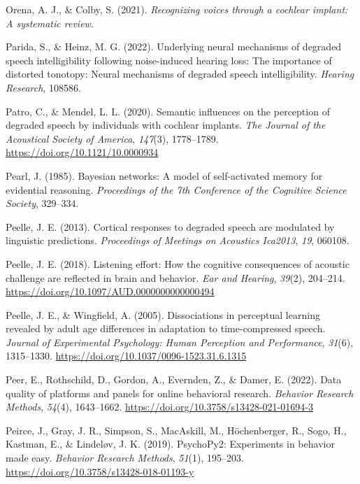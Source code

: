 \documentclass[a4paper, nobind]{templates/ociamthesis}
\newlength{\cslhangindent}
\newenvironment{CSLReferences}[2] %
 {%
  \setlength{\parindent}{0pt}
  \ifodd #1
  \let\oldpar\par
  \def\par{\hangindent=\cslhangindent\oldpar}
  \fi
  \setlength{\parskip}{1mm}
  \setlength{\baselineskip}{6mm}
 }%
 {}
\begin{document}
\begin{CSLReferences}{1}{0}
\leavevmode{}%
Orena, A. J., \& Colby, S. (2021). \emph{Recognizing voices through a cochlear implant: A systematic review}.

\leavevmode{}%
Parida, S., \& Heinz, M. G. (2022). Underlying neural mechanisms of degraded speech intelligibility following noise-induced hearing loss: The importance of distorted tonotopy: Neural mechanisms of degraded speech intelligibility. \emph{Hearing Research}, 108586.

\leavevmode{}%
Patro, C., \& Mendel, L. L. (2020). Semantic influences on the perception of degraded speech by individuals with cochlear implants. \emph{The Journal of the Acoustical Society of America}, \emph{147}(3), 1778--1789. \url{https://doi.org/10.1121/10.0000934}

\leavevmode{}%
Pearl, J. (1985). {Bayesian networks: A model of self-activated memory for evidential reasoning}. \emph{Proceedings of the 7th Conference of the Cognitive Science Society}, 329--334.

\leavevmode{}%
Peelle, J. E. (2013). Cortical responses to degraded speech are modulated by linguistic predictions. \emph{Proceedings of Meetings on Acoustics Ica2013}, \emph{19}, 060108.

\leavevmode{}%
Peelle, J. E. (2018). {Listening effort: How the cognitive consequences of acoustic challenge are reflected in brain and behavior}. \emph{Ear and Hearing}, \emph{39}(2), 204--214. \url{https://doi.org/10.1097/AUD.0000000000000494}

\leavevmode{}%
Peelle, J. E., \& Wingfield, A. (2005). {Dissociations in perceptual learning revealed by adult age differences in adaptation to time-compressed speech}. \emph{Journal of Experimental Psychology: Human Perception and Performance}, \emph{31}(6), 1315--1330. \url{https://doi.org/10.1037/0096-1523.31.6.1315}

\leavevmode{}%
Peer, E., Rothschild, D., Gordon, A., Evernden, Z., \& Damer, E. (2022). {Data quality of platforms and panels for online behavioral research}. \emph{Behavior Research Methods}, \emph{54}(4), 1643--1662. \url{https://doi.org/10.3758/s13428-021-01694-3}

\leavevmode{}%
Peirce, J., Gray, J. R., Simpson, S., MacAskill, M., Höchenberger, R., Sogo, H., Kastman, E., \& Lindeløv, J. K. (2019). {PsychoPy2: Experiments in behavior made easy}. \emph{Behavior Research Methods}, \emph{51}(1), 195--203. \url{https://doi.org/10.3758/s13428-018-01193-y}


\end{CSLReferences}
\end{document}
